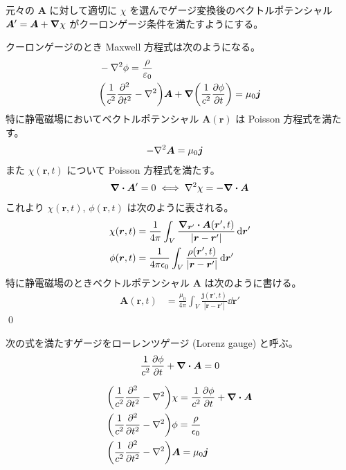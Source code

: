 \documentclass[uplatex,dvipdfmx,a4paper,11pt]{jlreq}
\makeatletter
\renewcommand{\AA}{\bm{A}}
\newcommand{\rr}{\bm{r}}
\theoremstyle{definition}
\renewenvironment{proof}[1][\proofname]{\par
  \normalfont
  \topsep6\p@\@plus6\p@ \trivlist
  \item[\hskip\labelsep{\bfseries #1}\@addpunct{\bfseries}]\ignorespaces\quad\par
}{%
  \qed\endtrivlist\@endpefalse
}
\renewcommand\proofname{証明}
\makeatother
\begin{document}
\begin{proposition}
  元々の $\AA$ に対して適切に $\chi$ を選んでゲージ変換後のベクトルポテンシャル $\AA' = \AA + \vnabla\chi$ がクーロンゲージ条件を満たすようにする。
\end{proposition}
\begin{proof}
  クーロンゲージのとき Maxwell 方程式は次のようになる。
  \begin{align}
     & -\laplacian\phi = \frac{\rho}{\varepsilon_0}                                                          \\
     & \qty(\frac{1}{c^2}\pdv[2]{t} - \laplacian)\AA + \vnabla\qty(\frac{1}{c^2}\pdv{\phi}{t}) = \mu_0\bm{j}
  \end{align}
  特に静電磁場においてベクトルポテンシャル $\AA(\rr)$ は Poisson 方程式を満たす。
  \begin{align}
    -\laplacian\AA & = \mu_0\bm{j}
  \end{align}
  また $\chi(\rr, t)$ について Poisson 方程式を満たす。
  \begin{align}
    \vnabla\vdot\AA' = 0 \iff \laplacian\chi = -\vnabla\vdot\AA
  \end{align}
  これより $\chi(\rr, t)$, $\phi(\rr, t)$ は次のように表される。
  \begin{align}
    \chi(\rr, t) & = \frac{1}{4\pi}\int_V\frac{\vnabla_{\rr'}\vdot\AA(\rr', t)}{|\rr - \rr'|}\dd{\rr'} \\
    \phi(\rr, t) & = \frac{1}{4\pi\epsilon_0}\int_V\frac{\rho(\rr', t)}{|\rr - \rr'|}\dd{\rr'}
  \end{align}
  特に静電磁場のときベクトルポテンシャル $\AA$ は次のように書ける。
  \begin{align}
    \AA(\rr, t) & = \frac{\mu_0}{4\pi}\int_V\frac{\bm{j}(\rr', t)}{|\rr - \rr'|}\dd{\rr'}
  \end{align}
\end{proof}

\begin{definition}
  次の式を満たすゲージをローレンツゲージ (Lorenz gauge) と呼ぶ。
  \begin{align}
    \frac{1}{c^2}\pdv{\phi}{t} + \vnabla\vdot\AA = 0
  \end{align}
\end{definition}
\begin{align}
   & \qty(\frac{1}{c^2}\pdv[2]{t} - \laplacian)\chi = \frac{1}{c^2}\pdv{\phi}{t} + \vnabla\vdot\AA \\
   & \qty(\frac{1}{c^2}\pdv[2]{t} - \laplacian)\phi = \frac{\rho}{\epsilon_0}                      \\
   & \qty(\frac{1}{c^2}\pdv[2]{t} - \laplacian)\AA = \mu_0\bm{j}
\end{align}
\end{document}
